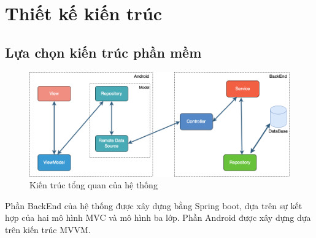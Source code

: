 \documentclass[../Main.tex]{subfiles}
\begin{document}
\section{Thiết kế kiến trúc}
\subsection{Lựa chọn kiến trúc phần mềm}
\begin{figure}[H]
    \centering
    \includegraphics[width=0.85\linewidth]{Figure/sys_architechture.png}
    \caption{Kiến trúc tổng quan của hệ thống}
    \label{fig:use_case_tổng_quan}
\end{figure}
Phần BackEnd của hệ thống được xây dựng bằng Spring boot, dựa trên sự kết hợp của hai mô hình MVC và mô hình ba lớp. Phần Android được xây dựng dựa trên kiến trúc MVVM.  
\end{document}
